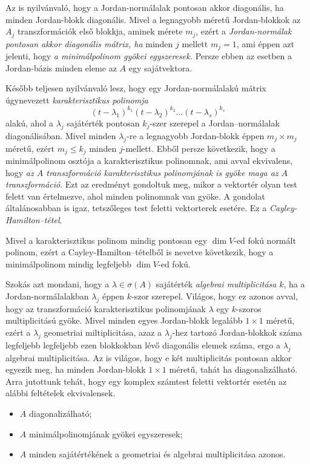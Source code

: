 \documentclass[9pt, a4paper, showtrims]{memoir}
\theoremstyle{plain}
\theoremstyle{remark}
\theoremstyle{definition}
\begin{document}
Az is nyilvánvaló, hogy a Jordan-normálalak pontosan akkor diagonális, ha minden Jordan-blokk diagonális.
Mivel a legnagyobb méretű Jordan-blokkok az $A_j$ transzformációk első blokkja, aminek mérete $m_j$, ezért a \emph{Jordan-normálak pontosan akkor diagonális mátrix, ha} minden $j$ mellett $m_j=1$,
ami éppen azt jelenti, hogy \emph{a minimálpolinom gyökei egyszeresek.}
Persze ebben az esetben a Jordan-bázis minden eleme az $A$ egy sajátvektora.

Később teljesen nyilvánvaló lesz, hogy egy Jordan-normálalakú mátrix
úgynevezett \emph{karakterisztikus polinomja}
\[
    \left( t-\lambda_1 \right)^{k_1}\left( t-\lambda_2 \right)^{k_2}\dots\left( t-\lambda_s \right)^{k_s}
\]
alakú,
ahol a $\lambda_j$ sajátérték pontosan $k_j$-szer szerepel a Jordan--normálalak diagonálisában.
Mivel minden $\lambda_j$-re a legnagyobb Jordan-blokk éppen $m_j\times m_j$ méretű,
ezért $m_j\leq k_j$ minden $j$-mellett.
Ebből persze következik, 
hogy a minimálpolinom osztója a karakterisztikus polinomnak, ami
avval ekvivalens,
hogy \emph{az $A$ transzformáció karakterisztikus polinomjának is gyöke maga az $A$ transzformáció}. 
Ezt az eredményt gondoltuk meg, mikor a vektortér olyan test felett van értelmezve,
ahol minden polinomnak van gyöke.
A gondolat általánosabban is igaz, tetszőleges test feletti vektorterek esetére.
Ez a \emph{Cayley-Hamilton--tétel}.

Mivel a karakterisztikus polinom mindig pontosan egy $\dim V$-ed fokú normált polinom,
ezért a Cayley-Hamilton--tételből is nevetve következik, 
hogy a minimálpolinom mindig legfeljebb $\dim V$-ed fokú.

Szokás azt mondani, hogy a $\lambda\in\sigma\left( A \right)$ sajátérték
\emph{algebrai multiplicitása} $k$,
ha a Jordan-normálalakban $\lambda_j$ éppen $k$-szor szerepel.
Világos, hogy ez azonos avval, hogy az transzformáció karakterisztikus polinomjának
$\lambda$ egy $k$-szoros multiplicitású gyöke.
Mivel minden egyes Jordan-blokk legalább $1\times 1$ méretű, 
ezért a $\lambda_j$ geometriai miltiplicitása, 
azaz a $\lambda_j$-hez tartozó Jordan-blokkok száma legfeljebb legfeljebb ezen blokkokban lévő diagonális elemek száma, 
ergo a $\lambda_j$ algebrai multiplicitása.
Az is világos, hogy e két multiplicitás pontosan akkor egyezik meg, 
ha minden Jordan-blokk $1\times 1$ méretű, tahát ha diagonalizálható.
Arra jutottunk tehát,
hogy egy komplex számtest feletti vektortér esetén az alábbi feltételek ekvivalensek.
\begin{itemize}\tightlist
    \item[\textendash] $A$ diagonalizálható;
    \item[\textendash] $A$ minimálpolinomjának gyökei egyszeresek;
    \item[\textendash] $A$ minden sajátértékének a geometriai és algebrai multiplicitása azonos.
\end{itemize}
\end{document}
